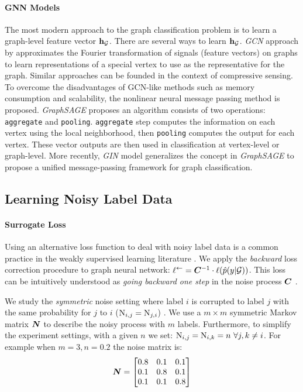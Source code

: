 \documentclass{article} %
\begin{document}
\paragraph{GNN Models} The most modern approach to the graph classification problem is to learn 
a graph-level feature vector ${\mathbf{h}}_{\mathcal{G}}$. There are several ways to learn ${\mathbf{h}}_{\mathcal{G}}$. \emph{GCN} approach 
by \cite{kipf2017semi} approximates the Fourier transformation of signals (feature vectors) on graphs to 
learn representations of a special vertex to use as the representative for the graph. Similar approaches 
can be founded in the context of compressive sensing. To overcome the disadvantages of GCN-like methods 
such as memory consumption and scalability, the nonlinear neural message passing method is proposed. 
\emph{GraphSAGE} \citep{hamilton2017inductive} proposes an algorithm consists of 
two operations: \texttt{aggregate} and \texttt{pooling}. \texttt{aggregate} step computes the information 
on each vertex using the local neighborhood, then \texttt{pooling} computes the output for each vertex.
These vector outputs are then used in classification at vertex-level or graph-level. More recently, 
\emph{GIN} \citep{xu2018how} model generalizes the concept in \emph{GraphSAGE} to propose a unified
message-passing framework for graph classification.

\subsection{Learning Noisy Label Data}
 
\paragraph{Surrogate Loss} Using an alternative loss function to deal with noisy label data is 
a common practice in the weakly supervised learning literature 
\citep{natarajan2013learning,biggio2012poisoning,georgakopoulos2016weakly,patrini2016loss,patrini2017making}. 
We apply the \emph{backward} loss correction procedure to graph neural network: 
$\ell^{\leftarrow} = {\bm{C}}^{-1} \cdot \ell(\hat{p}(y|{\mathcal{G}}))$. This loss can be intuitively understood 
as \emph{going backward one step} in the noise process ${\bm{C}}$ \citep{patrini2017making}.

We study the \emph{symmetric} noise setting where label 
$i$ is corrupted to label $j$ with the same probability for 
$j$ to $i$ (${\textnormal{N}}_{i,j} = {\textnormal{N}}_{j,i}$) \citep{biggio2012poisoning}. We use a
$m \times m$ symmetric Markov matrix ${\bm{N}}$ to describe the noisy process with $m$ labels.
Furthermore, to simplify the experiment settings, with a given $n$ we set:
$\ermN_{i,j} = \ermN_{i,k} = n \ \forall j, k \neq i$. For example when $m=3,
n=0.2$ the noise matrix is:
$$
{\bm{N}}=
  \begin{bmatrix}
    0.8 & 0.1 & 0.1 \\
    0.1 & 0.8 & 0.1 \\
    0.1 & 0.1 & 0.8
  \end{bmatrix}
$$
\end{document}
